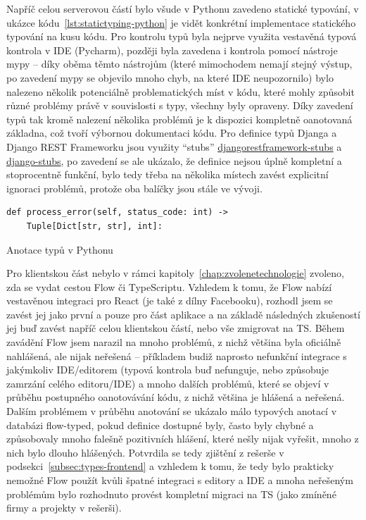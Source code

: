 Napříč celou serverovou částí bylo všude v Pythonu zavedeno statické typování, v ukázce kódu~\ref{lst:statictyping-python} je vidět konkrétní implementace statického typování na kusu kódu. Pro kontrolu typů byla nejprve využita vestavěná typová kontrola v IDE (Pycharm), později byla zavedena i kontrola pomocí nástroje mypy -- díky oběma těmto nástrojům (které mimochodem nemají stejný výstup, po zavedení mypy se objevilo mnoho chyb, na které IDE neupozornilo) bylo nalezeno několik potenciálně problematických míst v kódu, které mohly způsobit různé problémy právě v souvislosti s typy, všechny byly opraveny. Díky zavedení typů tak kromě nalezení několika problémů je k dispozici kompletně oanotovaná základna, což tvoří výbornou dokumentaci kódu. Pro definice typů Djanga a Django REST Frameworku jsou využity \enquote{stubs} \href{https://github.com/typeddjango/djangorestframework-stubs}{djangorestframework-stubs} a \href{https://github.com/typeddjango/django-stubs/}{django-stubs}, po zavedení se ale ukázalo, že definice nejsou úplně kompletní a stoprocentně funkční, bylo tedy třeba na několika místech zavést explicitní ignoraci problémů, protože oba balíčky jsou stále ve vývoji.

\begin{listing}[ht]
	\begin{verbatim}
def process_error(self, status_code: int) -> 
    Tuple[Dict[str, str], int]:
	\end{verbatim}
	\caption{Anotace typů v Pythonu}\label{lst:statictyping-python}
\end{listing}

Pro klientskou část nebylo v rámci kapitoly~\ref{chap:zvolenetechnologie} zvoleno, zda se vydat cestou Flow či TypeScriptu. Vzhledem k tomu, že Flow nabízí vestavěnou integraci pro React (je také z dílny Facebooku), rozhodl jsem se zavést jej jako první a pouze pro část aplikace a na základě následných zkušeností jej buď zavést napříč celou klientskou částí, nebo vše zmigrovat na TS. Během zavádění Flow jsem narazil na mnoho problémů, z nichž většina byla oficiálně nahlášená, ale nijak neřešená -- příkladem budiž naprosto nefunkční integrace s jakýmkoliv IDE/editorem (typová kontrola buď nefunguje, nebo způsobuje zamrzání celého editoru/IDE) a mnoho dalších problémů, které se objeví v průběhu postupného oanotovávání kódu, z nichž většina je hlášená a neřešená. Dalším problémem v průběhu anotování se ukázalo málo typových anotací v databázi flow-typed, pokud definice dostupné byly, často byly chybné a způsobovaly mnoho falešně pozitivních hlášení, které nešly nijak vyřešit, mnoho z nich bylo dlouho hlášených. Potvrdila se tedy zjištění z rešerše v podsekci~\ref{subsec:types-frontend} a vzhledem k tomu, že tedy bylo prakticky nemožné Flow použít kvůli špatné integraci s editory a IDE a mnoha neřešeným problémům bylo rozhodnuto provést kompletní migraci na TS (jako zmíněné firmy a projekty v rešerši).


